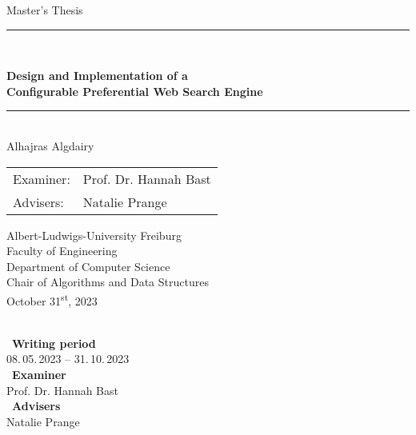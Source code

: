 
\begin{titlepage}
\begin{center}

\newcommand{\HorizontalLine}{\rule{\linewidth}{0.3mm}}

{\Large Master's Thesis}\\[1.3cm]


\HorizontalLine \\[0.4cm]
\begin{spacing}{3}
    {\huge \bfseries Design and Implementation of a } \\
    {\huge \bfseries Configurable Preferential Web Search Engine} \\
\end{spacing}
\HorizontalLine \\[1.5cm]


{\Huge Alhajras Algdairy} \\[2cm]


\begin{tabular}[hc]{>{\huge}l >{\huge}l}
  Examiner: & Prof. Dr. Hannah Bast \\[0.3cm]
  Advisers: & Natalie Prange \\[1.2cm]
\end{tabular}
\vfill  %

\Large {
    Albert-Ludwigs-University Freiburg\\
    Faculty of Engineering\\
    Department of Computer Science\\
    Chair of Algorithms and Data Structures\\[1cm]

    October 31\textsuperscript{st}, 2023\\
}
\end{center}
\end{titlepage}

\ \vfill \ \\  %
\
\textbf{Writing period}            \smallskip{} \\
08.\,05.\,2023 -- 31.\,10.\,2023   \bigskip{} \\
\
\textbf{Examiner}                  \smallskip{} \\
Prof. Dr. Hannah Bast               \bigskip{} \\
\
\textbf{Advisers}                  \smallskip{} \\
Natalie Prange
